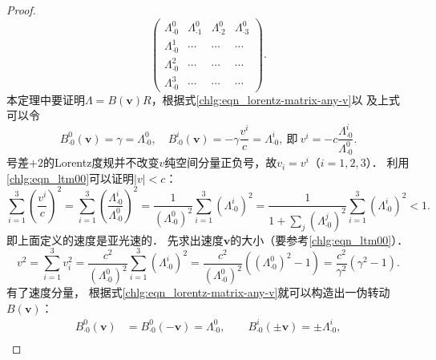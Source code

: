 \begin{proof}
\begin{equation}
\begin{pmatrix}
            \Lambda^0_{\cdot 0} & \Lambda^0_{\cdot 1} & \Lambda^0_{\cdot 2}& \Lambda^0_{\cdot 3}\\
            \Lambda^1_{\cdot 0} & \cdots & \cdots& \cdots\\
            \Lambda^2_{\cdot 0} & \cdots & \cdots& \cdots\\
            \Lambda^3_{\cdot 0} & \cdots & \cdots& \cdots
        \end{pmatrix} .
    \end{equation}
    本定理中要证明$\Lambda=B(\boldsymbol{v})R$，根据式\eqref{chlg:eqn_lorentz-matrix-any-v}以
    及上式可以令
    \begin{equation}
        B^{0}_{\cdot 0}(\boldsymbol{v})=\gamma = \Lambda^0_{\cdot 0}, \quad
        B^{i}_{\cdot 0}(\boldsymbol{v})=-\gamma\frac{v^i}{c}= {\Lambda^i_{\cdot 0}}, \ \text{即}\
        {v^i}= - {c}\frac{\Lambda^i_{\cdot 0}}{\Lambda^0_{\cdot 0}}.
    \end{equation}
    号差$+2$的Lorentz度规并不改变$v$纯空间分量正负号，故$v_i=v^i$（$i=1,2,3$）．
    利用\eqref{chlg:eqn_ltm00}可以证明$|v|<c$：
    \begin{equation*}
        \sum_{i=1}^{3}\left( \frac{v^i}{c}\right)^2
        =\sum_{i=1}^{3}\left( \frac{\Lambda^i_{\cdot 0}}{\Lambda^0_{\cdot 0}}\right)^2
        =\frac{1}{(\Lambda^0_{\cdot 0})^2} \sum_{i=1}^{3}\left( {\Lambda^i_{\cdot 0}}\right)^2
        =\frac{1}{1+\sum_{j}\left( {\Lambda^j_{\cdot 0}}\right)^2}
        \sum_{i=1}^{3}\left( {\Lambda^i_{\cdot 0}}\right)^2    <1  .
    \end{equation*}
    即上面定义的速度是亚光速的．
    先求出速度$\boldsymbol{v}$的大小（要参考\eqref{chlg:eqn_ltm00}）．
    \begin{equation}\label{chlg:eqn_ltdbr-v}
        v^2 = \sum_{i=1}^{3}v_i^2 =  \dfrac{c^2}{(\Lambda^0_{\cdot 0})^2} \sum_{i=1}^{3}
        ({\Lambda^i_{\cdot 0}})^2
        = \dfrac{c^2}{(\Lambda^0_{\cdot 0})^2}\left(  (\Lambda^0_{\cdot 0})^2 -1\right)
        = \dfrac{c^2}{\gamma^2}\left(  \gamma^2 -1\right).
    \end{equation} %
    有了速度分量，
    根据式\eqref{chlg:eqn_lorentz-matrix-any-v}就可以构造出一伪转动$B(\boldsymbol{v})$：
    \begin{equation}\label{chlg:eqn_ltdbr-b}
        \begin{aligned}
            B^{0}_{\cdot 0}(\boldsymbol{v}) &= B^{0}_{\cdot 0}(-\boldsymbol{v}) =  \Lambda ^{0}_{\cdot 0}, \qquad
            B^{i}_{\cdot 0}(\pm\boldsymbol{v}) = \pm \Lambda ^{i}_{\cdot 0}, \\

\end{aligned}
\end{equation}
\end{proof}
